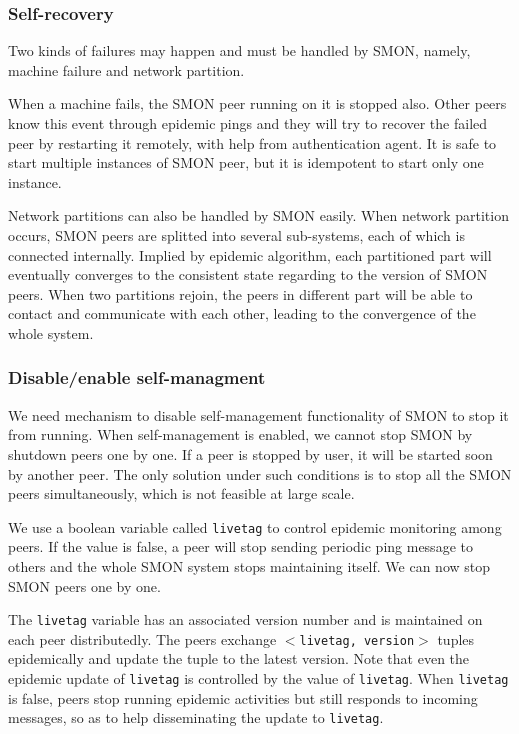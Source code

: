 \subsubsection*{Self-recovery}

Two kinds of failures may happen and must be handled by
SMON, namely, machine failure and network partition.

When a machine fails, the SMON peer running on it is stopped
also. Other peers know this event through epidemic pings and
they will try to recover the failed peer by restarting it
remotely, with help from authentication agent. It is safe to
start multiple instances of SMON peer, but it is idempotent
to start only one instance.

Network partitions can also be handled by SMON easily. When
network partition occurs, SMON peers are splitted into
several sub-systems, each of which is connected internally.
Implied by epidemic algorithm, each partitioned part will
eventually converges to the consistent state regarding to
the version of SMON peers. When two partitions rejoin, the
peers in different part will be able to contact and
communicate with each other, leading to the convergence of
the whole system.

\subsubsection*{Disable/enable self-managment}
\label{subsec:livetag}

We need mechanism to disable self-management functionality
of SMON to stop it from running. When self-management is
enabled, we cannot stop SMON by shutdown peers one by one.
If a peer is stopped by user, it will be started soon by
another peer. The only solution under such conditions is to
stop all the SMON peers simultaneously, which is not
feasible at large scale.

We use a boolean variable called \texttt{livetag} to control epidemic
monitoring among peers. If the value is false, a peer will
stop sending periodic ping message to others and the whole
SMON system stops maintaining itself. We can now stop SMON
peers one by one.

The \texttt{livetag} variable has an associated version
number and is maintained on each peer distributedly. The
peers exchange \texttt{$<$livetag, version$>$} tuples
epidemically and update the tuple to the latest version.
Note that even the epidemic update of \texttt{livetag} is
controlled by the value of \texttt{livetag}.  When
\texttt{livetag} is false, peers stop running epidemic
activities but still responds to incoming messages, so as to
help disseminating the update to \texttt{livetag}.

